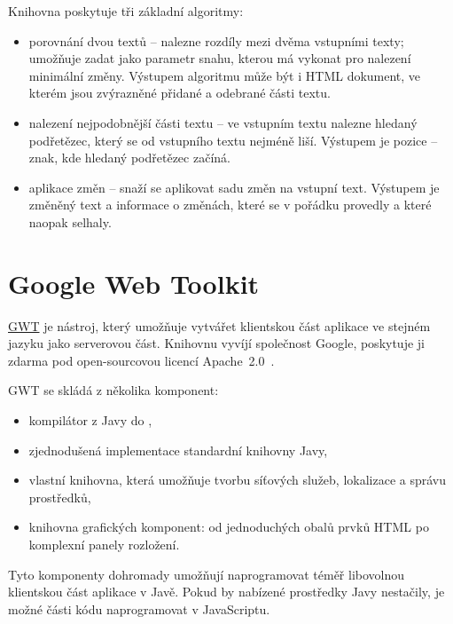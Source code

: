 Knihovna poskytuje tři základní algoritmy:
\begin{itemize}
	\item porovnání dvou textů -- nalezne rozdíly mezi dvěma vstupními texty; umožňuje zadat jako parametr snahu, kterou má vykonat pro nalezení minimální změny.
		Výstupem algoritmu může být i HTML dokument, ve kterém jsou zvýrazněné přidané a odebrané části textu.
	\item nalezení nejpodobnější části textu -- ve vstupním textu nalezne hledaný podřetězec, který se od vstupního textu nejméně liší.
		Výstupem je pozice -- znak, kde hledaný podřetězec začíná.
	\item aplikace změn -- snaží se aplikovat sadu změn na vstupní text.
		Výstupem je změněný text a informace o změnách, které se v pořádku provedly a které naopak selhaly.
\end{itemize}

\section{Google Web Toolkit}

\href{http://www.gwtproject.org/}{GWT} je nástroj, který umožňuje vytvářet klientskou část aplikace ve stejném jazyku jako serverovou část.
Knihovnu vyvíjí společnost Google, poskytuje ji zdarma pod open-sourcovou licencí Apache~2.0~\cite{apache20}.

GWT se skládá z několika komponent:
\begin{itemize}
	\item kompilátor z Javy do ,
	\item zjednodušená implementace standardní knihovny Javy,
	\item vlastní knihovna, která umožňuje tvorbu síťových služeb, lokalizace a správu prostředků,
	\item knihovna grafických komponent: od jednoduchých obalů prvků HTML po komplexní panely rozložení.
\end{itemize}

Tyto komponenty dohromady umožňují naprogramovat téměř libovolnou klientskou část aplikace v Javě.
Pokud by nabízené prostředky Javy nestačily, je možné části kódu naprogramovat v JavaScriptu.

